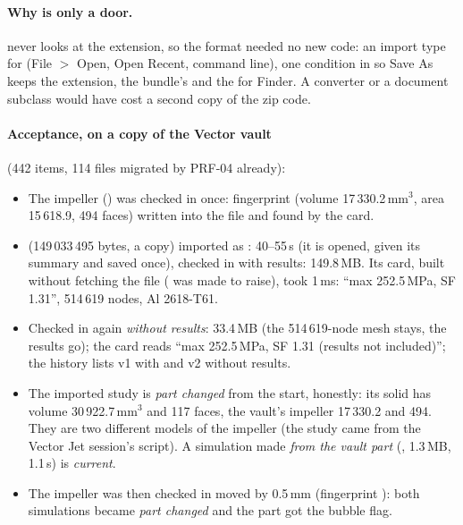 \paragraph{Why  is only a door.}  never looks at the extension, so the format needed
no new code: an import type for  (File $>$ Open, Open Recent, command line), one condition in
 so Save As keeps the extension, the bundle's  and the
 for Finder. A converter or a document subclass would have cost a second copy of the zip code.

\paragraph{Acceptance, on a copy of the Vector vault} (442 items, 114 files migrated by PRF-04 already):
\begin{itemize}[nosep]
  \item The impeller () was checked in once: fingerprint  (volume 17\,330.2\,mm$^3$,
        area 15\,618.9, 494 faces) written into the file and found by the card.
  \item {} (149\,033\,495 bytes, a copy) imported as : 40--55\,s (it is opened,
        given its summary and saved once), checked in with results: 149.8\,MB. Its card, built without fetching the file
        ( was made to raise), took 1\,ms: ``max 252.5\,MPa, SF 1.31'', 514\,619 nodes, Al 2618-T61.
  \item Checked in again \emph{without results}: 33.4\,MB (the 514\,619-node mesh stays, the results go); the card reads
        ``max 252.5\,MPa, SF 1.31 (results not included)''; the history lists v1 with and v2 without results.
  \item The imported study is \emph{part changed} from the start, honestly: its solid has volume 30\,922.7\,mm$^3$ and 117 faces,
        the vault's impeller 17\,330.2 and 494. They are two different models of the impeller (the study came from the Vector Jet
        session's script). A simulation made \emph{from the vault part} (, 1.3\,MB, 1.1\,s) is \emph{current}.
  \item The impeller was then checked in moved by 0.5\,mm (fingerprint ): both simulations became
        \emph{part changed} and the part got the bubble flag.
\end{itemize}

